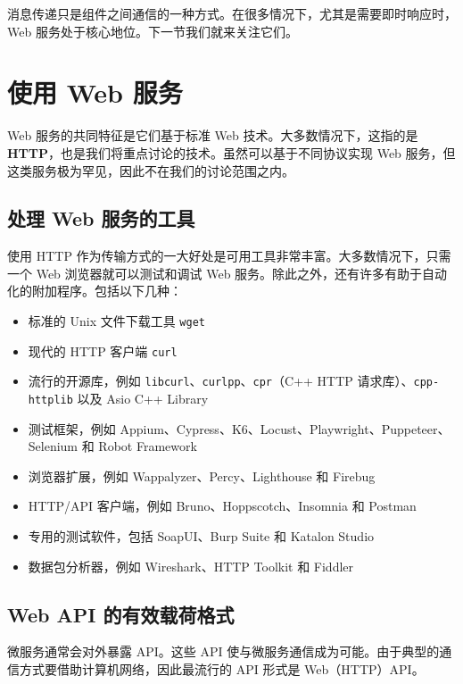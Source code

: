 消息传递只是组件之间通信的一种方式。在很多情况下，尤其是需要即时响应时，Web 服务处于核心地位。下一节我们就来关注它们。

\section{使用 Web 服务}

\label{idx:1571}
\label{idx:1572}
Web 服务的共同特征是它们基于标准 Web 技术。大多数情况下，这指的是 \textbf{HTTP}，也是我们将重点讨论的技术。虽然可以基于不同协议实现 Web 服务，但这类服务极为罕见，因此不在我们的讨论范围之内。

\subsection{处理 Web 服务的工具}

\label{idx:1573}
使用 HTTP 作为传输方式的一大好处是可用工具非常丰富。大多数情况下，只需一个 Web 浏览器就可以测试和调试 Web 服务。除此之外，还有许多有助于自动化的附加程序。包括以下几种：

\begin{itemize}
\item 标准的 Unix 文件下载工具 \texttt{wget}
\item 现代的 HTTP 客户端 \texttt{curl}
\item 流行的开源库，例如 \texttt{libcurl}、\texttt{curlpp}、\texttt{cpr}（C++ HTTP 请求库）、\texttt{cpp-httplib} 以及 Asio C++ Library
\item 测试框架，例如 Appium、Cypress、K6、Locust、Playwright、Puppeteer、Selenium 和 Robot Framework
\item 浏览器扩展，例如 Wappalyzer、Percy、Lighthouse 和 Firebug
\label{idx:1574}
\item HTTP/API 客户端，例如 Bruno、Hoppscotch、Insomnia 和 Postman
\item 专用的测试软件，包括 SoapUI、Burp Suite 和 Katalon Studio
\item 数据包分析器，例如 Wireshark、HTTP Toolkit 和 Fiddler
\end{itemize}

\subsection{Web API 的有效载荷格式}

\label{idx:1575}
微服务通常会对外暴露 API。这些 API 使与微服务通信成为可能。由于典型的通信方式要借助计算机网络，因此最流行的 API 形式是 Web（HTTP）API。

